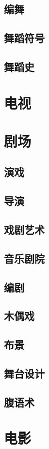 \documentclass[UTF8]{../RepresentationUniverse}
\begin{document}
\section{编舞}
\section{舞蹈符号}
\section{舞蹈史}

\chapter{电视}


\chapter{剧场}
\section{演戏}
\section{导演}
\section{戏剧艺术}
\section{音乐剧院}
\section{编剧}
\section{木偶戏}
\section{布景}
\section{舞台设计}
\section{腹语术}


\chapter{电影}
\end{document}
